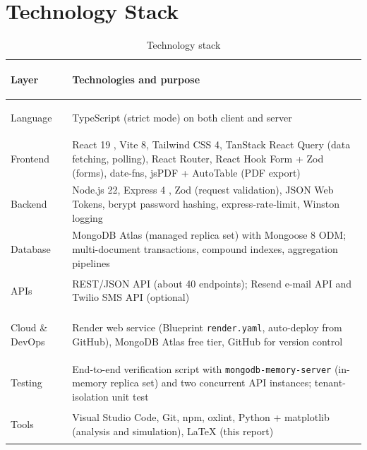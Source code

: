 \section{Technology Stack}
\begin{table}[H]
\centering
\small
\caption{Technology stack}
\label{tab:stack}
\begin{tabularx}{\textwidth}{>{\bfseries\raggedright\arraybackslash}p{3.0cm}X}
\toprule
Layer & Technologies and purpose \\
\midrule
Language & TypeScript (strict mode) on both client and server \\
Frontend & React 19 \cite{react}, Vite 8, Tailwind CSS 4, TanStack React Query (data fetching, polling), React Router, React Hook Form + Zod (forms), date-fns, jsPDF + AutoTable (PDF export) \\
Backend & Node.js 22, Express 4 \cite{express}, Zod (request validation), JSON Web Tokens, bcrypt password hashing, express-rate-limit, Winston logging \\
Database & MongoDB Atlas (managed replica set) with Mongoose 8 ODM; multi-document transactions, compound indexes, aggregation pipelines \\
APIs & REST/JSON API (about 40 endpoints); Resend e-mail API and Twilio SMS API (optional) \\
Cloud \& DevOps & Render web service \cite{render} (Blueprint \texttt{render.yaml}, auto-deploy from GitHub), MongoDB Atlas free tier, GitHub for version control \\
Testing & End-to-end verification script with \texttt{mongodb-memory-server} (in-memory replica set) and two concurrent API instances; tenant-isolation unit test \\
Tools & Visual Studio Code, Git, npm, oxlint, Python + matplotlib (analysis and simulation), \LaTeX{} (this report) \\
\bottomrule
\end{tabularx}
\end{table}
